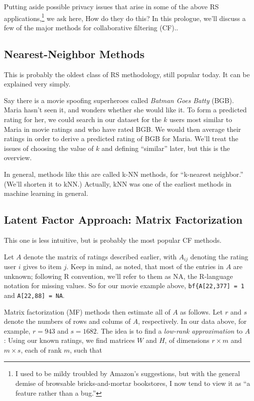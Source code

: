 Putting aside possible privacy issues that arise in some of the above RS
applications,\footnote{I used to be mildy
troubled by Amazon's suggestions, but with the general demise of
browsable bricks-and-mortar bookstores, I now tend to view it as ``a
feature rather than a bug.''} we ask here, How do they do this?  In this
prologue, we'll discuss a few of the major methods for collaborative
filtering (CF)..

\subsection{Nearest-Neighbor Methods}

This is probably the oldest class of RS methodology, still popular
today.  It can be explained very simply.

Say there is a movie spoofing superheroes called \textit{Batman Goes
Batty} (BGB).  Maria hasn't seen it, and wonders whether she would like
it.  To form a predicted rating for her, we could search in our dataset
for the $k$ users most similar to Maria in movie ratings and who have
rated BGB.  We would then average their ratings in order to derive a
predicted rating of BGB for Maria.  We'll treat the issues of choosing
the value of $k$ and defining ``similar'' later, but this is the
overview.

In general, methods like this are called k-NN methods,
for ``k-nearest neighbor.''  (We'll shorten it to kNN.)
Actually, kNN was one of the earliest methods in machine learning in
general.

\subsection{Latent Factor Approach:  Matrix Factorization}
\label{mf}

This one is less intuitive, but is probably the most popular CF methods.

Let $A$ denote the matrix of ratings described earlier, with $A_{ij}$
denoting the rating user $i$ gives to item $j$.  Keep in mind, as noted,
that most of the entries in $A$ are unknown; following R convention,
we'll refer to them as NA, the R-language notation for missing values.  
So for our movie example above, \lstinline{bf{A[22,377] = 1} and
\lstinline{A[22,88] = NA}.

Matrix factorization (MF) methods then estimate all of $A$ as follows.
Let $r$ and $s$ denote the numbers of rows and colums of $A$,
respectively.  In our data above, for example, $r = 943$ and $s = 1682$.
The idea is to find a \textit{low-rank approximation} to $A$:  Using our
known ratings, we find matrices $W$ and $H$, of dimensions $r \times m$
and $m \times s$, each of rank $m$, such that 

